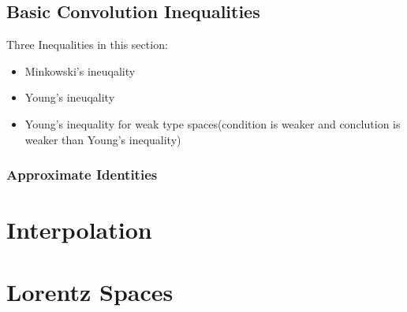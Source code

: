 \subsection{Basic Convolution Inequalities}

Three Inequalities in this section:
\begin{itemize}
    \item Minkowski's ineuqality
    \item Young's ineuqality
    \item Young's inequality for weak type spaces(condition is weaker and conclution is weaker than Young's inequality)
\end{itemize}

\subsubsection{Approximate Identities}


\section{Interpolation}

\section{Lorentz Spaces}
